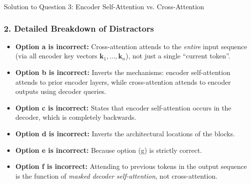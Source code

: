 \documentclass[11pt,a4paper]{article}
\begin{document}
\begin{solutionbox}{Solution to Question 3: Encoder Self-Attention vs. Cross-Attention}
\subsubsection*{2. Detailed Breakdown of Distractors}
\begin{itemize}[leftmargin=1.5em]
    \item \textbf{Option a is incorrect:} Cross-attention attends to the \emph{entire} input sequence (via all encoder key vectors $\mathbf{k}_1, \dots, \mathbf{k}_n$), not just a single ``current token''.
    \item \textbf{Option b is incorrect:} Inverts the mechanisms: encoder self-attention attends to prior encoder layers, while cross-attention attends to encoder outputs using decoder queries.
    \item \textbf{Option c is incorrect:} States that encoder self-attention occurs in the decoder, which is completely backwards.
    \item \textbf{Option d is incorrect:} Inverts the architectural locations of the blocks.
    \item \textbf{Option e is incorrect:} Because option (g) is strictly correct.
    \item \textbf{Option f is incorrect:} Attending to previous tokens in the output sequence is the function of \emph{masked decoder self-attention}, not cross-attention.
\end{itemize}
\end{solutionbox}
\end{document}
